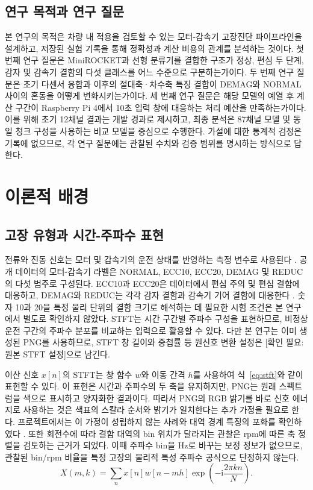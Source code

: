 \documentclass[11pt,a4paper]{article}
\newcommand{\checkneeded}[1]{\textcolor{red!65!black}{[확인 필요: #1]}}
\newcommand{\sourceproject}{\citep{project2026}}
\begin{document}
\subsection{연구 목적과 연구 질문}
본 연구의 목적은 차량 내 적용을 검토할 수 있는 모터-감속기 고장진단 파이프라인을 설계하고, 저장된 실험 기록을 통해 정확성과 계산 비용의 관계를 분석하는 것이다.
첫 번째 연구 질문은 MiniROCKET과 선형 분류기를 결합한 구조가 정상, 편심 두 단계, 감자 및 감속기 결함의 다섯 클래스를 어느 수준으로 구분하는가이다.
두 번째 연구 질문은 초기 다센서 융합과 이후의 절대축·차수축 특징 결합이 DEMAG와 NORMAL 사이의 혼동을 어떻게 변화시키는가이다.
세 번째 연구 질문은 해당 모델의 예열 후 계산 구간이 Raspberry Pi 4에서 10초 입력 창에 대응하는 처리 예산을 만족하는가이다.
이를 위해 초기 12채널 결과는 개발 경과로 제시하고, 최종 분석은 87채널 모델 및 동일 청크 구성을 사용하는 비교 모델을 중심으로 수행한다.
가설에 대한 통계적 검정은 기록에 없으므로, 각 연구 질문에는 관찰된 수치와 검증 범위를 명시하는 방식으로 답한다.

\section{이론적 배경}
\subsection{고장 유형과 시간-주파수 표현}
전류와 진동 신호는 모터 및 감속기의 운전 상태를 반영하는 측정 변수로 사용된다 \citep{aihub2022,park2024}.
공개 데이터의 모터-감속기 라벨은 NORMAL, ECC10, ECC20, DEMAG 및 REDUC의 다섯 범주로 구성된다.
ECC10과 ECC20은 데이터에서 편심 주의 및 편심 결함에 대응하고, DEMAG와 REDUC는 각각 감자 결함과 감속기 기어 결함에 대응한다 \citep{aihub2022}.
숫자 10과 20을 특정 물리 단위의 결함 크기로 해석하는 데 필요한 시험 조건은 본 연구에서 별도로 확인하지 않았다.
STFT는 시간 구간별 주파수 구성을 표현하므로, 비정상 운전 구간의 주파수 분포를 비교하는 입력으로 활용할 수 있다.
다만 본 연구는 이미 생성된 PNG를 사용하므로, STFT 창 길이와 중첩률 등 원신호 변환 설정은 \checkneeded{원본 STFT 설정}으로 남긴다.

이산 신호 $x[n]$의 STFT는 창 함수 $w$와 이동 간격 $h$를 사용하여 식~\eqref{eq:stft}와 같이 표현할 수 있다.
이 표현은 시간과 주파수의 두 축을 유지하지만, PNG는 원래 스펙트럼을 색으로 표시하고 양자화한 결과이다.
따라서 PNG의 RGB 밝기를 바로 신호 에너지로 사용하는 것은 색표의 스칼라 순서와 밝기가 일치한다는 추가 가정을 필요로 한다.
프로젝트에서는 이 가정이 성립하지 않는 사례와 대역 경계 특징의 포화를 확인하였다 \sourceproject.
또한 회전수에 따라 결함 대역의 bin 위치가 달라지는 관찰은 rpm에 따른 축 정렬을 검토하는 근거가 되었다.
이때 주파수 bin을 Hz로 바꾸는 보정 정보가 없으므로, 관찰된 bin/rpm 비율을 특정 고장의 물리적 특성 주파수 공식으로 단정하지 않는다.
\begin{equation}
 X(m,k)=\sum_n x[n]w[n-mh]\exp\left(-\mathrm{i}\frac{2\pi kn}{N}\right).
 \label{eq:stft}
\end{equation}
\end{document}
